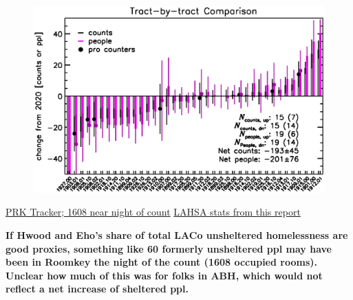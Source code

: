 \documentclass[11pt]{article}
\def\bfr{\bf\color{red}}
\begin{document}
\begin{figure}[]
	\centering
	\includegraphics[width = \textwidth, trim = 0cm 0cm 0cm 0cm]{tractsYrYr}
	\caption{}
	\label{fig:tcomp}
\end{figure}

\href{https://projectroomkeytracker.com/}{PRK Tracker; 1608 near night of count}
\href{https://www.lahsa.org/documents?id=4686-2020-greater-los-angeles-city-community-homelessness-report-service-planning-area-4.pdf}{LAHSA stats from this report}

{\bfr If Hwood and Eho's share of total LACo unsheltered homelessness are good proxies, something
like 60 formerly unsheltered ppl may have been in Roomkey the night of the count (1608 occupied rooms). 
Unclear how much of this was for folks in ABH, which would not reflect a net increase of sheltered ppl.}
\end{document}
